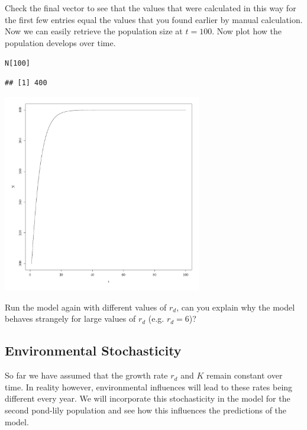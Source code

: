 \documentclass{article}\usepackage[]{graphicx}\usepackage[]{color}
\makeatletter
\newcommand{\hlnum}[1]{\textcolor[rgb]{0.686,0.059,0.569}{#1}}%
\newcommand{\hlstd}[1]{\textcolor[rgb]{0.345,0.345,0.345}{#1}}%
\newenvironment{kframe}{%
 \def\at@end@of@kframe{}%
 \ifinner\ifhmode%
  \def\at@end@of@kframe{\end{minipage}}%
  \begin{minipage}{\columnwidth}%
 \fi\fi%
 \def\FrameCommand##1{\hskip\@totalleftmargin \hskip-\fboxsep
 \colorbox{shadecolor}{##1}\hskip-\fboxsep
     \hskip-\linewidth \hskip-\@totalleftmargin \hskip\columnwidth}%
 \MakeFramed {\advance\hsize-\width
   \@totalleftmargin\z@ \linewidth\hsize
   \@setminipage}}%
 {\par\unskip\endMakeFramed%
 \at@end@of@kframe}
\newenvironment{knitrout}{}{} %
\makeatother
\begin{document}
Check the final vector to see that the values that were calculated in this way for the first few entries equal the values that you found earlier by manual calculation. Now we can easily retrieve the population size at $t=100$. Now plot how the population develops over time.
\begin{knitrout}
\color{fgcolor}\begin{kframe}
\begin{alltt}
\hlstd{N[}\hlnum{100}\hlstd{]}
\end{alltt}
\begin{verbatim}
## [1] 400
\end{verbatim}
\end{kframe}

{\centering \includegraphics[width=0.65\textwidth]{figure/k18-1} 

}



\end{knitrout}
Run the model again with different values of $r_d$, can you explain why the model behaves strangely for large values of $r_d$ (e.g. $r_d=6$)?

\subsection{Environmental Stochasticity}
So far we have assumed that the growth rate $r_d$ and $K$ remain constant over time. In reality however, environmental influences will lead to these rates being different every year. We will incorporate this stochasticity in the model for the second pond-lily population and see how this influences the predictions of the model.
\end{document}
